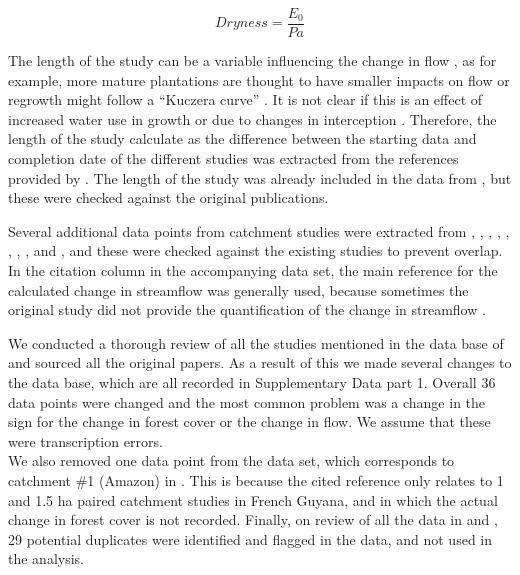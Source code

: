 \documentclass[]{elsarticle} %
\begin{document}
\begin{equation}
Dryness = \frac{E_{0}}{Pa} \label{eq:eq1}
\end{equation}

The length of the study can be a variable influencing the change in flow \citep[e.g.][]{jackson2005, filoso2017}, as for example, more mature plantations are thought to have smaller impacts on flow or regrowth might follow a ``Kuczera curve'' \citep{kuczera1987}. It is not clear if this is an effect of increased water use in growth \citep{vertessy2001} or due to changes in interception \citep{stoof2012}. Therefore, the length of the study calculate as the difference between the starting data and completion date of the different studies was extracted from the references provided by \citet{zhang2017}. The length of the study was already included in the data from \citet{filoso2017}, but these were checked against the original publications.

Several additional data points from catchment studies were extracted from \citet{almeida2016}, \citet{ferreto2020}, \citet{zhang2011}, \citet{zhao2010}, \citet{borg1988}, \citet{thornton2007}, \citet{zhou2010}, \citet{rodriguez2010}, \citet{ruprechtetal1991} and \citet{penaarancibia2012}, and these were checked against the existing studies to prevent overlap. In the citation column in the accompanying data set, the main reference for the calculated change in streamflow was generally used, because sometimes the original study did not provide the quantification of the change in streamflow \citep[i.e.~Table 6 in][]{zhang2011}.

We conducted a thorough review of all the studies mentioned in the data base of \citet{zhang2017} and sourced all the original papers. As a result of this we made several changes to the data base, which are all recorded in Supplementary Data part 1. Overall 36 data points were changed and the most common problem was a change in the sign for the change in forest cover or the change in flow. We assume that these were transcription errors.\\
We also removed one data point from the data set, which corresponds to catchment \#1 (Amazon) in \citet{zhang2017}. This is because the cited reference \citep{roche1981} only relates to 1 and 1.5 ha paired catchment studies in French Guyana, and in which the actual change in forest cover is not recorded. Finally, on review of all the data in \citet{zhang2017} and \citet{filoso2017}, 29 potential duplicates were identified and flagged in the data, and not used in the analysis.
\end{document}
